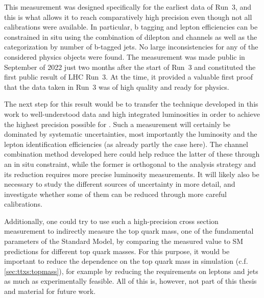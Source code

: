 This measurement was designed specifically for the earliest data of Run~3, and this is what allows it to reach comparatively high precision even though not all calibrations were available. In particular, b tagging and lepton efficiencies can be constrained in situ using the combination of dilepton and \ljets channels as well as the categorization by number of b-tagged jets. No large inconsistencies for any of the considered physics objects were found. The measurement was made public in September of 2022 just two months after the start of Run~3 and constituted the first public result of LHC Run~3. At the time, it provided a valuable first proof that the data taken in Run~3 was of high quality and ready for physics.

The next step for this result would be to transfer the technique developed in this work to well-understood data and high integrated luminosities in order to achieve the highest precision possible for \sigmatt. Such a measurement will certainly be dominated by systematic uncertainties, most importantly the luminosity and the lepton identification efficiencies (as already partly the case here). The channel combination method developed here could help reduce the latter of these through an in situ constraint, while the former is orthogonal to the analysis strategy and its reduction requires more precise luminosity measurements. It will likely also be necessary to study the different sources of uncertainty in more detail, and investigate whether some of them can be reduced through more careful calibrations.

Additionally, one could try to use such a high-precision \ttbar cross section measurement to indirectly measure the top quark mass, one of the fundamental parameters of the Standard Model, by comparing the measured value to SM predictions for different top quark masses. For this purpose, it would be important to reduce the dependence on the top quark mass in simulation (c.f. \cref{sec:ttxs:topmass}), for example by reducing the \pt requirements on leptons and jets as much as experimentally feasible. All of this is, however, not part of this thesis and material for future work.

